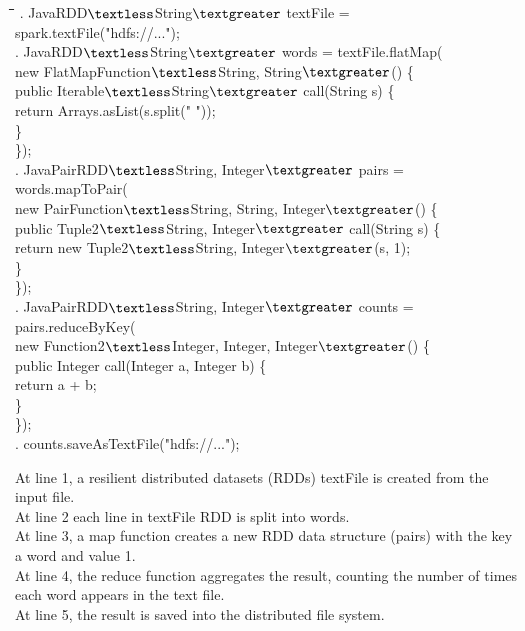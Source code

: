 \documentclass{lmproj}
\begin{document}
\begin{tabbing}
	\hspace*{2cm}\=\hspace*{1cm}\=\hspace*{0.5cm}\=\hspace*{1cm}\=\hspace*{1cm}\= \kill
	. \> JavaRDD$\textless$String$\textgreater$ textFile = spark.textFile("hdfs://..."); \\
	. \> JavaRDD$\textless$String$\textgreater$ words = textFile.flatMap( \\
	\>    \>  \> new FlatMapFunction$\textless$String, String$\textgreater$() \{ \\
	\>    \>  \> \> public Iterable$\textless$String$\textgreater$ call(String s) \{ \\
	\>    \>  \> \> \> return Arrays.asList(s.split(" ")); \\
	\>    \>  \> \> \} \\
	\>    \>  \> \}); \\
	. \> JavaPairRDD$\textless$String, Integer$\textgreater$ pairs = words.mapToPair( \\
	\>    \>  \>  new PairFunction$\textless$String, String, Integer$\textgreater$() \{ \\
	\>    \>  \> \> public Tuple2$\textless$String, Integer$\textgreater$ call(String s) \{  \\
	\>    \>  \> \> \> return new Tuple2$\textless$String, Integer$\textgreater$(s, 1); \\
	\>    \>  \> \> \} \\
	\>    \>  \> \}); \\
	. \> JavaPairRDD$\textless$String, Integer$\textgreater$ counts = pairs.reduceByKey( \\
	\>    \>  \> new Function2$\textless$Integer, Integer, Integer$\textgreater$() \{ \\
	\>    \>  \> \>	public Integer call(Integer a, Integer b) \{ \\
	\>    \>  \> \> \>	return a + b; \\
	\>    \>  \> \>	\} \\
	\>    \>  \> \}); \\
	. \> counts.saveAsTextFile("hdfs://..."); \\
\end{tabbing}

At line 1, a resilient distributed datasets (RDDs) textFile is created from the input file.\\
At line 2 each line in textFile RDD is split into words.\\
At line 3, a map function creates a new RDD data structure (pairs) with the key a word and value 1. \\
At line 4, the reduce function aggregates the result, counting the number of times each word appears in the text file. \\
At line 5, the result is saved into the distributed file system.
\end{document}

